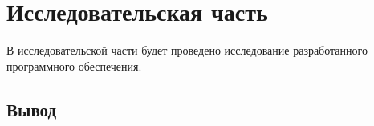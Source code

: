 \chapter{Исследовательская часть}
В исследовательской части будет проведено исследование разработанного программного обеспечения.
\section*{Вывод}
